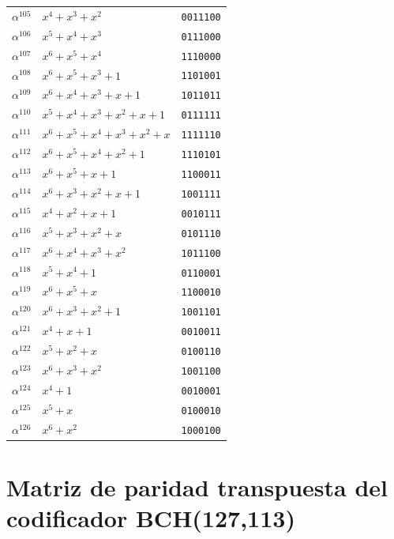 \documentclass[10pt,a4paper]{article}
\begin{document}
\begin{longtable}{@{}c l c@{}}
    $\alpha^{105}$ & $x^{4}+x^{3}+x^{2}$ & \texttt{0011100} \\
    $\alpha^{106}$ & $x^{5}+x^{4}+x^{3}$ & \texttt{0111000} \\
    $\alpha^{107}$ & $x^{6}+x^{5}+x^{4}$ & \texttt{1110000} \\
    $\alpha^{108}$ & $x^{6}+x^{5}+x^{3}+1$ & \texttt{1101001} \\
    $\alpha^{109}$ & $x^{6}+x^{4}+x^{3}+x+1$ & \texttt{1011011} \\
    $\alpha^{110}$ & $x^{5}+x^{4}+x^{3}+x^{2}+x+1$ & \texttt{0111111} \\
    $\alpha^{111}$ & $x^{6}+x^{5}+x^{4}+x^{3}+x^{2}+x$ & \texttt{1111110} \\
    $\alpha^{112}$ & $x^{6}+x^{5}+x^{4}+x^{2}+1$ & \texttt{1110101} \\
    $\alpha^{113}$ & $x^{6}+x^{5}+x+1$ & \texttt{1100011} \\
    $\alpha^{114}$ & $x^{6}+x^{3}+x^{2}+x+1$ & \texttt{1001111} \\
    $\alpha^{115}$ & $x^{4}+x^{2}+x+1$ & \texttt{0010111} \\
    $\alpha^{116}$ & $x^{5}+x^{3}+x^{2}+x$ & \texttt{0101110} \\
    $\alpha^{117}$ & $x^{6}+x^{4}+x^{3}+x^{2}$ & \texttt{1011100} \\
    $\alpha^{118}$ & $x^{5}+x^{4}+1$ & \texttt{0110001} \\
    $\alpha^{119}$ & $x^{6}+x^{5}+x$ & \texttt{1100010} \\
    $\alpha^{120}$ & $x^{6}+x^{3}+x^{2}+1$ & \texttt{1001101} \\
    $\alpha^{121}$ & $x^{4}+x+1$ & \texttt{0010011} \\
    $\alpha^{122}$ & $x^{5}+x^{2}+x$ & \texttt{0100110} \\
    $\alpha^{123}$ & $x^{6}+x^{3}+x^{2}$ & \texttt{1001100} \\
    $\alpha^{124}$ & $x^{4}+1$ & \texttt{0010001} \\
    $\alpha^{125}$ & $x^{5}+x$ & \texttt{0100010} \\
    $\alpha^{126}$ & $x^{6}+x^{2}$ & \texttt{1000100} \\
\end{longtable}
\endgroup

\clearpage
\section{Matriz de paridad transpuesta del codificador BCH(127,113)}
\label{anexo:matriz-paridad-bch}
\end{document}
